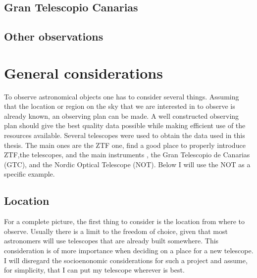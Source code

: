 \documentclass[a4paper,oneside,12pt, class=Latex/Classes/PhDthesisPSnPDF, crop=false]{standalone}
\begin{document}
\subsection{Gran Telescopio Canarias}


\subsection{Other observations}


\section{General considerations}
To observe astronomical objects one has to consider several things. Assuming that the location or region on the sky that we are interested in to observe is already known, an observing plan can be made. A well constructed observing plan should give the best quality data possible while making efficient use of the resources available. Several telescopes were used to obtain the data used in this thesis. The main ones are the \color{red}ZTF one, find a good place to properly introduce ZTF,the telescopes, and the main instruments \color{black}, the Gran Telescopio de Canarias (GTC), and the Nordic Optical Telescope (NOT). Below I will use the NOT as a specific example.


\subsection{Location}
For a complete picture, the first thing to consider is the location from where to observe. Usually there is a limit to the freedom of choice, given that most astronomers will use telescopes that are already built somewhere. This consideration is of more importance when deciding on a place for a new telescope. I will disregard the socioenonomic considerations for such a project and assume, for simplicity, that I can put my telescope wherever is best.
\end{document}
